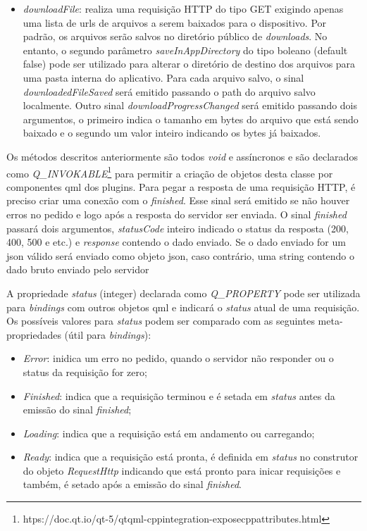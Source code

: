 \begin{itemize}
	\item \textit{downloadFile}: realiza uma requisição HTTP do tipo GET exigindo apenas uma lista de urls de arquivos a serem baixados para o dispositivo. Por padrão, os arquivos serão salvos no diretório público de \textit{downloads}. No entanto, o segundo parâmetro \textit{saveInAppDirectory} do tipo boleano (default false) pode ser utilizado para alterar o diretório de destino dos arquivos para uma pasta interna do aplicativo. Para cada arquivo salvo, o sinal \textit{downloadedFileSaved} será emitido passando o path do arquivo salvo localmente. Outro sinal \textit{downloadProgressChanged} será emitido passando dois argumentos, o primeiro indica o tamanho em bytes do arquivo que está sendo baixado e o segundo um valor inteiro indicando os bytes já baixados.
\end{itemize}

Os métodos descritos anteriormente são todos \textit{void} e assíncronos e são declarados como \textit{Q\_INVOKABLE}\footnote{htps://doc.qt.io/qt-5/qtqml-cppintegration-exposecppattributes.html} para permitir a criação de objetos desta classe por componentes qml dos plugins. Para pegar a resposta de uma requisição HTTP, é preciso criar uma conexão com o \textit{finished}. Esse sinal será emitido se não houver erros no pedido e logo após a resposta do servidor ser enviada. O sinal \textit{finished} passará dois argumentos, \textit{statusCode} inteiro indicado o status da resposta (200, 400, 500 e etc.) e \textit{response} contendo o dado enviado. Se o dado enviado for um json válido será enviado como objeto json, caso contrário, uma string contendo o dado bruto enviado pelo servidor\par

A propriedade \textit{status} (integer) declarada como \textit{Q\_PROPERTY} pode ser utilizada para \textit{bindings} com outros objetos qml e indicará o \textit{status} atual de uma requisição. Os possíveis valores para \textit{status} podem ser comparado com as seguintes meta-propriedades (útil para \textit{bindings}):

\begin{itemize}
	\item \textit{Error}: inidica um erro no pedido, quando o servidor não responder ou o status da requisição for zero;
	\item \textit{Finished}: indica que a requisição terminou e é setada em \textit{status} antes da emissão do sinal \textit{finished};
	\item \textit{Loading}: indica que a requisição está em andamento ou carregando;
	\item \textit{Ready}: indica que a requisição está pronta, é definida em \textit{status} no construtor do objeto \textit{RequestHttp} indicando que está pronto para inicar requisições e também, é setado após a emissão do sinal \textit{finished}.
\end{itemize}

